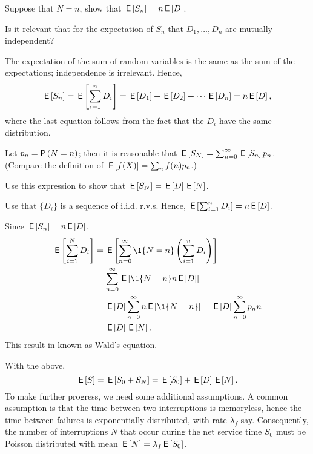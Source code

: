 \begin{exercise}
  Suppose that $N=n$, show that $\,\mathsf{E}\left[S_n\right]=n\,\mathsf{E}\left[D\right]$.

\begin{hint}
    Is it relevant that for the expectation of $S_n$ that $D_1,\ldots, D_n$ are mutually independent?
  \end{hint}
\begin{solution}
The expectation of the sum of random variables is the same as the sum of the expectations; independence is irrelevant. Hence,
\begin{equation*}
  \,\mathsf{E}\left[S_n \right] =  \,\mathsf{E}\left[\sum_{i=1}^n D_i\right]= \,\mathsf{E}\left[D_1\right] + \,\mathsf{E}\left[D_2\right] + \cdots \,\mathsf{E}\left[D_n\right] = n \,\mathsf{E}\left[D\right],
\end{equation*}
where the last equation follows from the fact that the $D_i$ have the same distribution. 
\end{solution}
\end{exercise}

Let $p_n=\P{N=n}$; then it is reasonable that $\,\mathsf{E}\left[S_N\right]=\sum_{n=0}^\infty \,\mathsf{E}\left[S_n\right]p_n$. (Compare the definition of $\,\mathsf{E}\left[f(X)\right]=\sum_{n} f(n) p_n$.)

\begin{exercise}\label{ex:16}
Use this expression to show that $\,\mathsf{E}\left[S_N\right]=\,\mathsf{E}\left[D\right] \,\mathsf{E}\left[N\right]$.
\begin{hint}
  Use that $\{D_i\}$ is a sequence of i.i.d. r.v.s. Hence, $\,\mathsf{E}\left[\sum_{i=1}^n D_i\right] = n \,\mathsf{E}\left[D\right]$. 
\end{hint}
\begin{solution}
Since $\,\mathsf{E}\left[S_n\right] = n \,\mathsf{E}\left[D\right]$, 
\begin{align*}
  \E{\sum_{i=1}^N D_i} 
&=  \E{ \sum_{n=0}^\infty \1{N=n} \left(\sum_{i=1}^n D_i \right)} \\
&=  \sum_{n=0}^\infty \E{\1{N=n} n\E{D}} \\
&=  \E{D} \sum_{n=0}^\infty n \E{\1{N=n}} = \E D \sum_{n=0}^\infty p_n n \\
&= \E D \E N.
\end{align*}
This result in known as Wald's equation. 
\end{solution}
\end{exercise}

With the above, 
\begin{equation*}
  \,\mathsf{E}\left[S\right] = \,\mathsf{E}\left[S_0 + S_N\right] = \,\mathsf{E}\left[S_0\right] + \,\mathsf{E}\left[D\right] \,\mathsf{E}\left[N\right].
\end{equation*}
To make further progress, we need some additional assumptions. A common assumption is that the time between two interruptions is memoryless, hence the time between failures is exponentially distributed, with rate $\lambda_f$ say.  Consequently, the number of interruptions $N$ that occur during the net service time $S_0$ must be Poisson distributed with mean $\,\mathsf{E}\left[N\right] = \lambda_f \,\mathsf{E}\left[S_0\right]$. 


